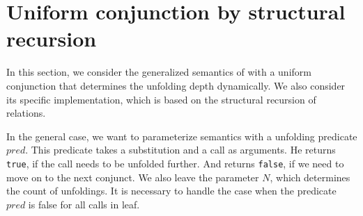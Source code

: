 \section{Uniform conjunction by structural recursion}

In this section, we consider the generalized semantics of \mk with a uniform conjunction that determines the unfolding depth dynamically. We also consider its specific implementation, which is based on the structural recursion of relations.

In the general case, we want to parameterize semantics with a unfolding predicate $pred$. This predicate takes a substitution and a call as arguments. He returns \lstinline{true}, if the call needs to be unfolded further. And returns \lstinline{false}, if we need to move on to the next conjunct. We also leave the parameter $N$, which determines the count of unfoldings. It is necessary to handle the case when the predicate $pred$ is false for all calls in leaf.

